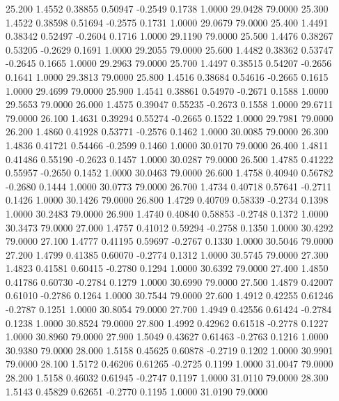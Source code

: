   25.200   1.4552   0.38855   0.50947  -0.2549   0.1738   1.0000  29.0428  79.0000
  25.300   1.4522   0.38598   0.51694  -0.2575   0.1731   1.0000  29.0679  79.0000
  25.400   1.4491   0.38342   0.52497  -0.2604   0.1716   1.0000  29.1190  79.0000
  25.500   1.4476   0.38267   0.53205  -0.2629   0.1691   1.0000  29.2055  79.0000
  25.600   1.4482   0.38362   0.53747  -0.2645   0.1665   1.0000  29.2963  79.0000
  25.700   1.4497   0.38515   0.54207  -0.2656   0.1641   1.0000  29.3813  79.0000
  25.800   1.4516   0.38684   0.54616  -0.2665   0.1615   1.0000  29.4699  79.0000
  25.900   1.4541   0.38861   0.54970  -0.2671   0.1588   1.0000  29.5653  79.0000
  26.000   1.4575   0.39047   0.55235  -0.2673   0.1558   1.0000  29.6711  79.0000
  26.100   1.4631   0.39294   0.55274  -0.2665   0.1522   1.0000  29.7981  79.0000
  26.200   1.4860   0.41928   0.53771  -0.2576   0.1462   1.0000  30.0085  79.0000
  26.300   1.4836   0.41721   0.54466  -0.2599   0.1460   1.0000  30.0170  79.0000
  26.400   1.4811   0.41486   0.55190  -0.2623   0.1457   1.0000  30.0287  79.0000
  26.500   1.4785   0.41222   0.55957  -0.2650   0.1452   1.0000  30.0463  79.0000
  26.600   1.4758   0.40940   0.56782  -0.2680   0.1444   1.0000  30.0773  79.0000
  26.700   1.4734   0.40718   0.57641  -0.2711   0.1426   1.0000  30.1426  79.0000
  26.800   1.4729   0.40709   0.58339  -0.2734   0.1398   1.0000  30.2483  79.0000
  26.900   1.4740   0.40840   0.58853  -0.2748   0.1372   1.0000  30.3473  79.0000
  27.000   1.4757   0.41012   0.59294  -0.2758   0.1350   1.0000  30.4292  79.0000
  27.100   1.4777   0.41195   0.59697  -0.2767   0.1330   1.0000  30.5046  79.0000
  27.200   1.4799   0.41385   0.60070  -0.2774   0.1312   1.0000  30.5745  79.0000
  27.300   1.4823   0.41581   0.60415  -0.2780   0.1294   1.0000  30.6392  79.0000
  27.400   1.4850   0.41786   0.60730  -0.2784   0.1279   1.0000  30.6990  79.0000
  27.500   1.4879   0.42007   0.61010  -0.2786   0.1264   1.0000  30.7544  79.0000
  27.600   1.4912   0.42255   0.61246  -0.2787   0.1251   1.0000  30.8054  79.0000
  27.700   1.4949   0.42556   0.61424  -0.2784   0.1238   1.0000  30.8524  79.0000
  27.800   1.4992   0.42962   0.61518  -0.2778   0.1227   1.0000  30.8960  79.0000
  27.900   1.5049   0.43627   0.61463  -0.2763   0.1216   1.0000  30.9380  79.0000
  28.000   1.5158   0.45625   0.60878  -0.2719   0.1202   1.0000  30.9901  79.0000
  28.100   1.5172   0.46206   0.61265  -0.2725   0.1199   1.0000  31.0047  79.0000
  28.200   1.5158   0.46032   0.61945  -0.2747   0.1197   1.0000  31.0110  79.0000
  28.300   1.5143   0.45829   0.62651  -0.2770   0.1195   1.0000  31.0190  79.0000
